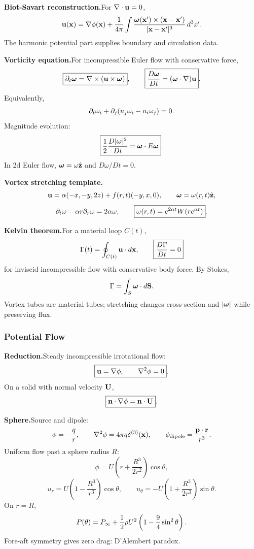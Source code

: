 \noindent\textbf{Biot-Savart reconstruction.}\quad For $\nabla\cdot\mathbf{u}=0$,
\[
  \mathbf{u}(\mathbf{x})=\nabla\phi(\mathbf{x})
  +\frac{1}{4\pi}\int
  \frac{\boldsymbol{\omega}(\mathbf{x}')\times(\mathbf{x}-\mathbf{x}')}{|\mathbf{x}-\mathbf{x}'|^3}\,d^3x'.
\]
The harmonic potential part supplies boundary and circulation data.

\noindent\textbf{Vorticity equation.}\quad For incompressible Euler flow with conservative force,
\[
  \boxed{\partial_t\boldsymbol{\omega}=\nabla\times(\mathbf{u}\times\boldsymbol{\omega})},
  \qquad
  \boxed{\frac{D\boldsymbol{\omega}}{Dt}=(\boldsymbol{\omega}\cdot\nabla)\mathbf{u}}.
\]
Equivalently,
\[
  \partial_t\omega_i+\partial_j(u_j\omega_i-u_i\omega_j)=0.
\]
Magnitude evolution:
\[
  \boxed{\frac{1}{2}\frac{D|\boldsymbol{\omega}|^2}{Dt}=\boldsymbol{\omega}\cdot E\boldsymbol{\omega}}.
\]
In 2d Euler flow, $\boldsymbol{\omega}=\omega\hat{\mathbf z}$ and $D\omega/Dt=0$.

\noindent\textbf{Vortex stretching template.}\quad
\[
  \mathbf{u}=\alpha(-x,-y,2z)+f(r,t)(-y,x,0),
  \qquad
  \boldsymbol{\omega}=\omega(r,t)\hat{\mathbf z},
\]
\[
  \partial_t\omega-\alpha r\partial_r\omega=2\alpha\omega,
  \qquad
  \boxed{\omega(r,t)=e^{2\alpha t}W(re^{\alpha t})}.
\]

\noindent\textbf{Kelvin theorem.}\quad For a material loop $C(t)$,
\[
  \Gamma(t)=\oint_{C(t)}\mathbf{u}\cdot d\mathbf{x},
  \qquad
  \boxed{\frac{D\Gamma}{Dt}=0}
\]
for inviscid incompressible flow with conservative body force. By Stokes,
\[
  \Gamma=\int_S\boldsymbol{\omega}\cdot d\mathbf S.
\]
Vortex tubes are material tubes; stretching changes cross-section and $|\boldsymbol{\omega}|$ while preserving flux.

\subsubsection*{Potential Flow}

\noindent\textbf{Reduction.}\quad Steady incompressible irrotational flow:
\[
  \boxed{\mathbf{u}=\nabla\phi,\qquad \nabla^2\phi=0}.
\]
On a solid with normal velocity $\mathbf{U}$,
\[
  \boxed{\mathbf n\cdot\nabla\phi=\mathbf n\cdot\mathbf{U}}.
\]

\noindent\textbf{Sphere.}\quad Source and dipole:
\[
  \phi=-\frac{q}{r},\qquad
  \nabla^2\phi=4\pi q\delta^{(3)}(\mathbf{x}),
  \qquad
  \phi_{\rm dipole}=\frac{\mathbf p\cdot\mathbf r}{r^3}.
\]
Uniform flow past a sphere radius $R$:
\[
  \boxed{\phi=U\left(r+\frac{R^3}{2r^2}\right)\cos\theta},
\]
\[
  u_r=U\left(1-\frac{R^3}{r^3}\right)\cos\theta,
  \qquad
  u_\theta=-U\left(1+\frac{R^3}{2r^3}\right)\sin\theta.
\]
On $r=R$,
\[
  P(\theta)=P_\infty+\frac{1}{2}\rho U^2\left(1-\frac94\sin^2\theta\right).
\]
Fore-aft symmetry gives zero drag: D'Alembert paradox.

